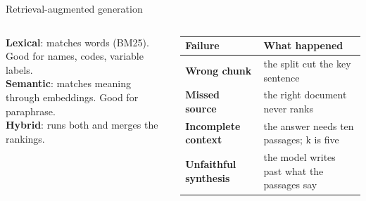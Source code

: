 \begin{frame}{Retrieval-augmented generation}
  \begin{center}
  \end{center}
  \vspace{0.35em}
  \begin{columns}[T,onlytextwidth]
      {\small
      \textbf{\color{ink}Lexical}: matches words (BM25). Good for names, codes, variable labels.\\[0.3em]
      \textbf{\color{ink}Semantic}: matches meaning through embeddings. Good for paraphrase.\\[0.3em]
      \textbf{\color{ink}Hybrid}: runs both and merges the rankings.\par}
      \renewcommand{\arraystretch}{1.15}
      {\scriptsize
      \begin{tabularx}{\linewidth}{>{\bfseries\color{ink}}l >{\leavevmode\color{dark}}X}
      \toprule
      Failure & What happened\\
      \midrule
      Wrong chunk & the split cut the key sentence\\
      Missed source & the right document never ranks\\
      Incomplete context & the answer needs ten passages; k is five\\
      Unfaithful synthesis & the model writes past what the passages say\\
      \bottomrule
      \end{tabularx}}
  \end{columns}
\end{frame}

